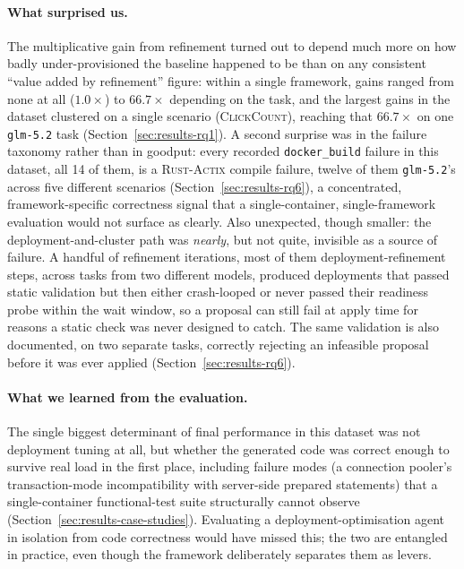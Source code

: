 \paragraph{What surprised us.} The multiplicative gain from refinement
turned out to depend much more on how badly under-provisioned the
baseline happened to be than on any consistent ``value added by
refinement'' figure: within a single framework, gains ranged from none at
all ($1.0\times$) to $66.7\times$ depending on the task, and the
largest gains in the dataset clustered on a single scenario
(\textsc{ClickCount}), reaching that $66.7\times$ on one \texttt{glm-5.2}
task (Section~\ref{sec:results-rq1}). A second surprise was in the
failure taxonomy rather than in goodput: every recorded
\texttt{docker\_build} failure in this dataset, all 14 of them, is a
\textsc{Rust-Actix} compile failure, twelve of them \texttt{glm-5.2}'s
across five different scenarios (Section~\ref{sec:results-rq6}), a
concentrated, framework-specific correctness signal that a
single-container, single-framework evaluation would not surface as
clearly. Also unexpected, though smaller: the deployment-and-cluster path
was \emph{nearly}, but not quite, invisible as a source of failure. A
handful of refinement iterations, most of them deployment-refinement
steps, across tasks from two different models, produced deployments that
passed static validation but then either crash-looped or never passed
their readiness probe within the wait window, so a proposal can still
fail at apply time for reasons a static check was never designed to
catch. The same
validation is also documented, on two separate tasks, correctly rejecting
an infeasible proposal before it was ever applied
(Section~\ref{sec:results-rq6}).

\paragraph{What we learned from the evaluation.} The single biggest
determinant of final performance in this dataset was not deployment
tuning at all, but whether the generated code was correct enough to
survive real load in the first place, including failure modes (a
connection pooler's transaction-mode incompatibility with server-side
prepared statements) that a single-container functional-test suite
structurally cannot observe (Section~\ref{sec:results-case-studies}). Evaluating a
deployment-optimisation agent in isolation from code correctness would
have missed this; the two are entangled in practice, even though the
framework deliberately separates them as levers.


